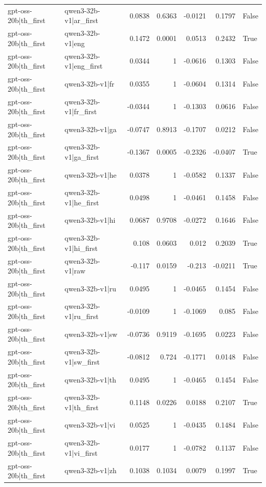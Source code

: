 \begin{table}
\begin{tabular}{l l r r r r l}
gpt-oss-20b|th_first & qwen3-32b-v1|ar_first & 0.0838 & 0.6363 & -0.0121 & 0.1797 & False \\
gpt-oss-20b|th_first & qwen3-32b-v1|eng & 0.1472 & 0.0001 & 0.0513 & 0.2432 & True \\
gpt-oss-20b|th_first & qwen3-32b-v1|eng_first & 0.0344 & 1 & -0.0616 & 0.1303 & False \\
gpt-oss-20b|th_first & qwen3-32b-v1|fr & 0.0355 & 1 & -0.0604 & 0.1314 & False \\
gpt-oss-20b|th_first & qwen3-32b-v1|fr_first & -0.0344 & 1 & -0.1303 & 0.0616 & False \\
gpt-oss-20b|th_first & qwen3-32b-v1|ga & -0.0747 & 0.8913 & -0.1707 & 0.0212 & False \\
gpt-oss-20b|th_first & qwen3-32b-v1|ga_first & -0.1367 & 0.0005 & -0.2326 & -0.0407 & True \\
gpt-oss-20b|th_first & qwen3-32b-v1|he & 0.0378 & 1 & -0.0582 & 0.1337 & False \\
gpt-oss-20b|th_first & qwen3-32b-v1|he_first & 0.0498 & 1 & -0.0461 & 0.1458 & False \\
gpt-oss-20b|th_first & qwen3-32b-v1|hi & 0.0687 & 0.9708 & -0.0272 & 0.1646 & False \\
gpt-oss-20b|th_first & qwen3-32b-v1|hi_first & 0.108 & 0.0603 & 0.012 & 0.2039 & True \\
gpt-oss-20b|th_first & qwen3-32b-v1|raw & -0.117 & 0.0159 & -0.213 & -0.0211 & True \\
gpt-oss-20b|th_first & qwen3-32b-v1|ru & 0.0495 & 1 & -0.0465 & 0.1454 & False \\
gpt-oss-20b|th_first & qwen3-32b-v1|ru_first & -0.0109 & 1 & -0.1069 & 0.085 & False \\
gpt-oss-20b|th_first & qwen3-32b-v1|sw & -0.0736 & 0.9119 & -0.1695 & 0.0223 & False \\
gpt-oss-20b|th_first & qwen3-32b-v1|sw_first & -0.0812 & 0.724 & -0.1771 & 0.0148 & False \\
gpt-oss-20b|th_first & qwen3-32b-v1|th & 0.0495 & 1 & -0.0465 & 0.1454 & False \\
gpt-oss-20b|th_first & qwen3-32b-v1|th_first & 0.1148 & 0.0226 & 0.0188 & 0.2107 & True \\
gpt-oss-20b|th_first & qwen3-32b-v1|vi & 0.0525 & 1 & -0.0435 & 0.1484 & False \\
gpt-oss-20b|th_first & qwen3-32b-v1|vi_first & 0.0177 & 1 & -0.0782 & 0.1137 & False \\
gpt-oss-20b|th_first & qwen3-32b-v1|zh & 0.1038 & 0.1034 & 0.0079 & 0.1997 & True \\

\end{tabular}
\end{table}
